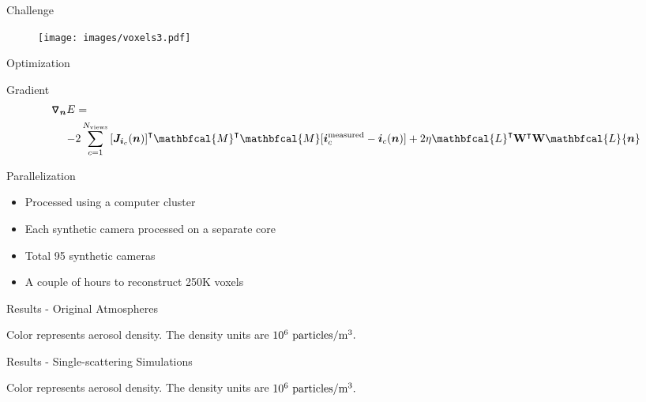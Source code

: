 \documentclass[compress,red,12pt]{beamer}
\newcommand{\Grad}[1]{\bm{\triangledown_{#1}}}
\newcommand{\transpose}[1]{{#1}^\intercal}
\newcommand{\MaskSun}{\mathbfcal{M}}
\newcommand{\Laplacian}{\mathbfcal{L}}
\begin{document}

\begin{frame}{Challenge}
  \begin{figure}
    \centering
    \centerline{\texttt{[image: images/voxels3.pdf]}}
  \end{figure}
\end{frame}


\begin{frame}[label=gradient]{Optimization}
  \begin{block}{Gradient}
    \begin{align*}
      \Grad{{\bm n}} E &= \\
      -&2\sum_{c=1}^{N_{\rm views}}
      \transpose{\left[{\bm J}_{{\bm i}_c}({\bm n})\right]} \transpose{\MaskSun}\MaskSun[{\bm i}^{\rm
        measured}_c - {\bm i}_c({\bm n})] + 2 \eta
      \transpose{\Laplacian}\transpose{{\bf W}}{\bf W}\Laplacian{\bm n}
    \end{align*}
  \end{block}
  \hfill\hyperlink{jacobian}{}
\end{frame}


\begin{frame}{Parallelization}
  \begin{itemize}
  \item Processed using a computer cluster
  \item Each synthetic camera processed on a separate core
  \item Total 95 synthetic cameras
  \item A couple of hours to reconstruct 250K voxels
  \end{itemize}
\end{frame}


\begin{frame}{Results - Original Atmospheres}
  \centerline{\def\svgwidth{1.15\linewidth}\footnotesize{}}
  \centerline{\footnotesize Color represents aerosol density. The
    density units are $10^{6}~{\rm particles}/{\rm m}^3.$}
\end{frame}


\begin{frame}{Results - Single-scattering Simulations}
  \centerline{\def\svgwidth{1.15\linewidth}\footnotesize{}}
  \centerline{\footnotesize Color represents aerosol density. The
    density units are $10^{6}~{\rm particles}/{\rm m}^3.$}
\end{frame}
\end{document}
